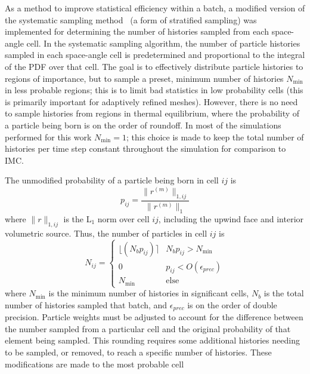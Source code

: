 As a method to improve statistical efficiency within a batch, a modified version of the systematic
sampling method~\cite{shultis_mc} (a form of stratified sampling) was implemented for determining the number of
histories sampled from each space-angle cell.  In the systematic sampling algorithm, the
number of particle histories sampled in each space-angle cell is predetermined and
proportional to the integral of the
PDF over that cell.  The goal is to effectively distribute particle histories to regions of
importance, but to sample a preset, minimum number of histories $N_{\min}$ in less probable
regions; this is to limit bad statistics in low probability cells (this is primarily important for adaptively
refined meshes).  However, there is no need to sample histories
from regions in thermal equilibrium, where the probability of a particle being born is on
the order of roundoff.  In most of the simulations performed for this work
$N_{\min}=1$; this choice is made to keep the total number of histories per time
step constant throughout the simulation for comparison to IMC.  

The unmodified probability of a particle being born in cell $ij$ is 
\begin{equation}
    p_{ij} = \frac{\|r^{(m)}\|_{1,{ij}}}{\|r^{(m)}\|_1}
\end{equation}
where $\|r\|_{1,ij}$ is the L$_1$ norm over cell $ij$, including the upwind face and interior
volumetric source.
Thus, the number of
particles in cell $ij$ is 
\begin{equation}\label{eq:sys_N}
    N_{ij} = 
\left\{\begin{matrix}
    \lfloor(N_bp_{ij})\rceil & N_bp_{ij} > N_{\min}
    \\ 0 & p_{ij} < O(\epsilon_{prec})
\\ N_{\min} & \text{else}
\end{matrix}\right.
\end{equation}
where $N_{\min}$ is the minimum number of histories in significant cells, $N_b$ is the
total number of histories sampled that batch, and
$\epsilon_{prec}$ is on the order of double precision.  
Particle weights must be adjusted to account for
the difference between the number sampled from a particular cell and the original probability
of that element being sampled.  This rounding requires some additional histories
needing to be sampled, or removed, to reach a specific number of histories.  These
modifications are made to the most probable cell

